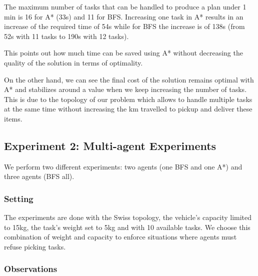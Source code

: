 \documentclass[11pt]{article}
\begin{document}
\begin{minipage}[]{\textwidth}
\begin{minipage}[]{0.6\textwidth}
{\begin{tabular}{|c|c|c|c|c|c|c|c|c|c|c|}
\end{tabular}%
}
\label{tab:single-agent}
\end{minipage}{}
\hfill
\begin{minipage}[]{0.35\textwidth}
The maximum number of tasks that can be handled to produce a plan under 1 min is 16 for A* (33s) and  11 for BFS. Increasing one task in A* results in an increase of the required time of 54s while for BFS the increase is of 138s (from 52s with 11 tasks to 190s with 12 tasks). 
\end{minipage}{}

\end{minipage}

This points out how much time can be saved using A* without decreasing the quality of the solution in terms of optimality. 

On the other hand, we can see the final cost of the solution remains optimal with A* and stabilizes around a value when we keep increasing the number of tasks. This is due to the topology of our problem which allows to handle multiple tasks at the same time without increasing the km travelled to pickup and deliver these items. 




\subsection{Experiment 2: Multi-agent Experiments}
We perform two different experiments: two agents (one BFS and one A*) and three agents (BFS all).

\subsubsection{Setting}
The experiments are done with the Swiss topology, the vehicle's capacity limited to 15kg, the task's weight set to 5kg and with 10 available tasks. We choose this combination of weight and capacity to enforce situations where agents must refuse picking tasks. 

\subsubsection{Observations}
\end{document}
